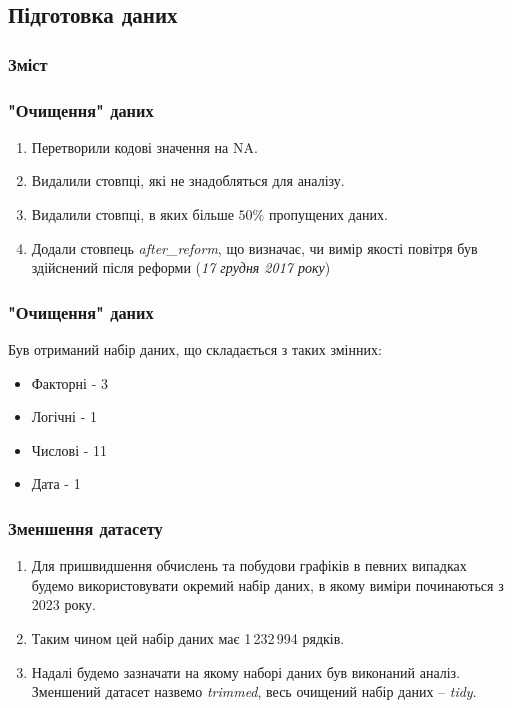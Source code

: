 \documentclass{beamer}
\begin{document}
\begin{frame}
  \section{Підготовка даних}

  \frametitle{Зміст}
  \tableofcontents[currentsection]
\end{frame}

\begin{frame}
  \frametitle{"Очищення" даних}

  \begin{enumerate}
    \item Перетворили кодові значення на NA.
    \item Видалили стовпці, які не знадобляться для аналізу.
    \item Видалили стовпці, в яких більше $50\%$ пропущених даних.
    \item Додали стовпець \textit{after\_reform}, що визначає, чи вимір
    якості повітря був здійснений після реформи (\textit{17 грудня 2017 року})
  \end{enumerate}
\end{frame}

\begin{frame}
  \frametitle{"Очищення" даних}

  Був отриманий набір даних, що складається з таких змінних:

  \begin{itemize}
    \item Факторні - 3
    \item Логічні - 1
    \item Числові - 11
    \item Дата - 1
  \end{itemize}
\end{frame}

\begin{frame}
  \frametitle{Зменшення датасету}

  \begin{enumerate}
    \item Для пришвидшення обчислень та побудови графіків в певних випадках будемо використовувати
    окремий набір даних, в якому виміри починаються з 2023 року.
    \item Таким чином цей набір даних має 1\,232\,994 рядків.
    \item Надалі будемо зазначати на якому наборі даних був виконаний аналіз. Зменшений
    датасет назвемо \textit{trimmed}, весь очищений набір даних -- \textit{tidy}.
  \end{enumerate}

\end{frame}
\end{document}
